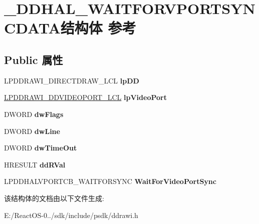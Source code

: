 \hypertarget{struct___d_d_h_a_l___w_a_i_t_f_o_r_v_p_o_r_t_s_y_n_c_d_a_t_a}{}\section{\+\_\+\+D\+D\+H\+A\+L\+\_\+\+W\+A\+I\+T\+F\+O\+R\+V\+P\+O\+R\+T\+S\+Y\+N\+C\+D\+A\+T\+A结构体 参考}
\label{struct___d_d_h_a_l___w_a_i_t_f_o_r_v_p_o_r_t_s_y_n_c_d_a_t_a}
\subsection*{Public 属性}
\begin{DoxyCompactItemize}
\item 
\mbox{\label{struct___d_d_h_a_l___w_a_i_t_f_o_r_v_p_o_r_t_s_y_n_c_d_a_t_a_ac37d3ee5464a3b6cd2e93ba419d19bbd}} 
L\+P\+D\+D\+R\+A\+W\+I\+\_\+\+D\+I\+R\+E\+C\+T\+D\+R\+A\+W\+\_\+\+L\+CL {\bfseries lp\+DD}
\item 
\mbox{\label{struct___d_d_h_a_l___w_a_i_t_f_o_r_v_p_o_r_t_s_y_n_c_d_a_t_a_a9de4e5f3b71ee32915454337d0c75367}} 
\hyperlink{struct___d_d_r_a_w_i___d_d_v_i_d_e_o_p_o_r_t___l_c_l}{L\+P\+D\+D\+R\+A\+W\+I\+\_\+\+D\+D\+V\+I\+D\+E\+O\+P\+O\+R\+T\+\_\+\+L\+CL} {\bfseries lp\+Video\+Port}
\item 
\mbox{\label{struct___d_d_h_a_l___w_a_i_t_f_o_r_v_p_o_r_t_s_y_n_c_d_a_t_a_ae348783789d890e79242a6e0e24524cd}} 
D\+W\+O\+RD {\bfseries dw\+Flags}
\item 
\mbox{\label{struct___d_d_h_a_l___w_a_i_t_f_o_r_v_p_o_r_t_s_y_n_c_d_a_t_a_a567ce0e7e7e3135aa9db45ca2d70d733}} 
D\+W\+O\+RD {\bfseries dw\+Line}
\item 
\mbox{\label{struct___d_d_h_a_l___w_a_i_t_f_o_r_v_p_o_r_t_s_y_n_c_d_a_t_a_a4a320350405ca62fc54a55da8f12b35b}} 
D\+W\+O\+RD {\bfseries dw\+Time\+Out}
\item 
\mbox{\label{struct___d_d_h_a_l___w_a_i_t_f_o_r_v_p_o_r_t_s_y_n_c_d_a_t_a_aefb9de74062ee74340e60f18151139bc}} 
H\+R\+E\+S\+U\+LT {\bfseries dd\+R\+Val}
\item 
\mbox{\label{struct___d_d_h_a_l___w_a_i_t_f_o_r_v_p_o_r_t_s_y_n_c_d_a_t_a_aca0625e3211e0363fe57e0cc3530dc11}} 
L\+P\+D\+D\+H\+A\+L\+V\+P\+O\+R\+T\+C\+B\+\_\+\+W\+A\+I\+T\+F\+O\+R\+S\+Y\+NC {\bfseries Wait\+For\+Video\+Port\+Sync}
\end{DoxyCompactItemize}


该结构体的文档由以下文件生成\+:\begin{DoxyCompactItemize}
\item 
E\+:/\+React\+O\+S-\/0../sdk/include/psdk/ddrawi.\+h\end{DoxyCompactItemize}

